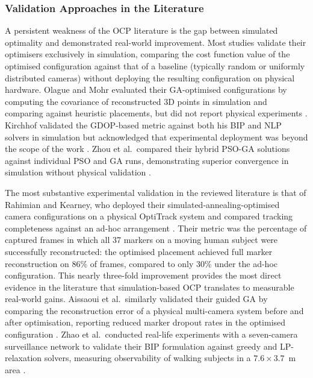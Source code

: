 \subsubsection{Validation Approaches in the Literature}
\label{sec:lit-validation}

A persistent weakness of the \gls{OCP} literature is the gap between simulated optimality and demonstrated real-world improvement. Most studies validate their optimisers exclusively in simulation, comparing the cost function value of the optimised configuration against that of a baseline (typically random or uniformly distributed cameras) without deploying the resulting configuration on physical hardware. Olague and Mohr evaluated their GA-optimised configurations by computing the covariance of reconstructed 3D points in simulation and comparing against heuristic placements, but did not report physical experiments \parencite{olagueOptimalCameraPlacement2002}. Kirchhof validated the \gls{GDOP}-based metric against both his \gls{BIP} and NLP solvers in simulation but acknowledged that experimental deployment was beyond the scope of the work \parencite{kirchhofOptimalPlacementMultiple2013}. Zhou et al.\ compared their hybrid PSO-GA solutions against individual PSO and GA runs, demonstrating superior convergence in simulation without physical validation \parencite{zhouSensorPlacementOptimization2024}.

The most substantive experimental validation in the reviewed literature is that of Rahimian and Kearney, who deployed their simulated-annealing-optimised camera configurations on a physical OptiTrack system and compared tracking completeness against an ad-hoc arrangement \parencite{rahimianOptimalCameraPlacement2017}. Their metric was the percentage of captured frames in which all 37 markers on a moving human subject were successfully reconstructed: the optimised placement achieved full marker reconstruction on 86\% of frames, compared to only 30\% under the ad-hoc configuration. This nearly three-fold improvement provides the most direct evidence in the literature that simulation-based \gls{OCP} translates to measurable real-world gains. Aissaoui et al.\ similarly validated their guided GA by comparing the reconstruction error of a physical multi-camera system before and after optimisation, reporting reduced marker dropout rates in the optimised configuration \parencite{aissaouiDesigningCameraPlacement2018}. Zhao et al.\ conducted real-life experiments with a seven-camera surveillance network to validate their \gls{BIP} formulation against greedy and LP-relaxation solvers, measuring observability of walking subjects in a $7.6 \times 3.7$~m area \parencite{zhaoApproximateTechniquesSolving2013}.

